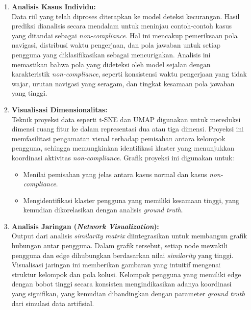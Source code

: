 \begin{enumerate}
    \item \textbf{Analisis Kasus Individu:} \\
    Data riil yang telah diproses diterapkan ke model deteksi kecurangan. Hasil prediksi dianalisis secara mendalam untuk meninjau contoh-contoh kasus yang ditandai sebagai \textit{non-compliance}. Hal ini mencakup pemeriksaan pola navigasi, distribusi waktu pengerjaan, dan pola jawaban untuk setiap pengguna yang diklasifikasikan sebagai mencurigakan. Analisis ini memastikan bahwa pola yang dideteksi oleh model sejalan dengan karakteristik \textit{non-compliance}, seperti konsistensi waktu pengerjaan yang tidak wajar, urutan navigasi yang seragam, dan tingkat kesamaan pola jawaban yang tinggi.

    \item \textbf{Visualisasi Dimensionalitas:} \\
    Teknik proyeksi data seperti t-SNE dan UMAP digunakan untuk mereduksi dimensi ruang fitur ke dalam representasi dua atau tiga dimensi. Proyeksi ini memfasilitasi pengamatan visual terhadap pemisahan antara kelompok pengguna, sehingga memungkinkan identifikasi klaster yang menunjukkan koordinasi aktivitas \textit{non-compliance}. Grafik proyeksi ini digunakan untuk:
    \begin{itemize}
        \item Menilai pemisahan yang jelas antara kasus normal dan kasus \textit{non-compliance}.
        \item Mengidentifikasi klaster pengguna yang memiliki kesamaan tinggi, yang kemudian dikorelasikan dengan analisis \textit{ground truth}.
    \end{itemize}

    \item \textbf{Analisis Jaringan (\textit{Network Visualization}):} \\
    Output dari analisis \textit{similarity matrix} diintegrasikan untuk membangun grafik hubungan antar pengguna. Dalam grafik tersebut, setiap node mewakili pengguna dan edge dihubungkan berdasarkan nilai \textit{similarity} yang tinggi. Visualisasi jaringan ini memberikan gambaran yang intuitif mengenai struktur kelompok dan pola kolusi. Kelompok pengguna yang memiliki edge dengan bobot tinggi secara konsisten mengindikasikan adanya koordinasi yang signifikan, yang kemudian dibandingkan dengan parameter \textit{ground truth} dari simulasi data artifisial.


\end{enumerate}
